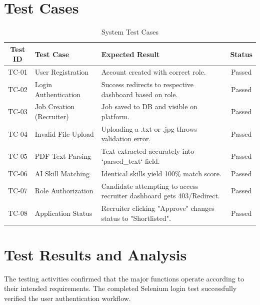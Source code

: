 \documentclass[12pt,a4paper]{report}
\begin{document}
\section{Test Cases}
\begin{table}[H]
\centering
\begin{tabular}{|c|p{4cm}|p{5cm}|c|}
\hline
\textbf{Test ID} & \textbf{Test Case} & \textbf{Expected Result} & \textbf{Status} \\ \hline
TC-01 & User Registration & Account created with correct role. & Passed \\ \hline
TC-02 & Login Authentication & Success redirects to respective dashboard based on role. & Passed \\ \hline
TC-03 & Job Creation (Recruiter) & Job saved to DB and visible on platform. & Passed \\ \hline
TC-04 & Invalid File Upload & Uploading a .txt or .jpg throws validation error. & Passed \\ \hline
TC-05 & PDF Text Parsing & Text extracted accurately into `parsed_text` field. & Passed \\ \hline
TC-06 & AI Skill Matching & Identical skills yield 100\% match score. & Passed \\ \hline
TC-07 & Role Authorization & Candidate attempting to access recruiter dashboard gets 403/Redirect. & Passed \\ \hline
TC-08 & Application Status & Recruiter clicking "Approve" changes status to "Shortlisted". & Passed \\ \hline
\end{tabular}
\caption{System Test Cases}
\end{table}

\section{Test Results and Analysis}
The testing activities confirmed that the major functions operate according to their intended requirements. The completed Selenium login test successfully verified the user authentication workflow.
\end{document}
